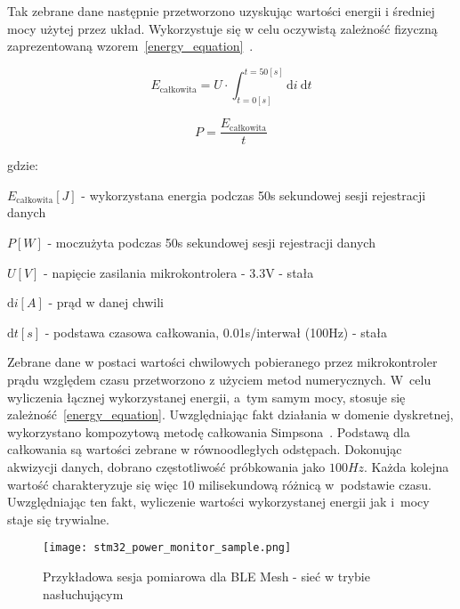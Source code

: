 Tak zebrane dane następnie przetworzono uzyskując wartości energii i średniej mocy
użytej przez układ. Wykorzystuje się w celu oczywistą zależność fizyczną zaprezentowaną
wzorem~\ref{energy_equation}~\cite{skoro_marta_fizyka_1973}.

\begin{equation} \label{energy_equation}
E_{\text{całkowita}} = U \cdot \int_{t=0[s]}^{t=50[s]} \mathrm{d}i \: \mathrm{d} t
\end{equation}

\begin{equation} \label{power_equation}
P = \frac{E_{\text{całkowita}}}{t}
\end{equation}

gdzie:

\begin{description}
\item $E_{\text{całkowita}} [J]$ - wykorzystana energia podczas 50s sekundowej sesji rejestracji danych
\item $P [W]$ - moczużyta podczas 50s sekundowej sesji rejestracji danych
\item $U [V]$ - napięcie zasilania mikrokontrolera - 3.3V - stała
\item $\mathrm{d}i [A]$ - prąd w danej chwili
\item $\mathrm{d}t [s]$ - podstawa czasowa całkowania, 0.01s/interwał (100Hz) - stała 
\end{description}

Zebrane dane w postaci wartości chwilowych pobieranego przez mikrokontroler prądu względem czasu
przetworzono z użyciem metod numerycznych. W~celu wyliczenia łącznej wykorzystanej energii, a~tym samym
mocy, stosuje się zależność~\ref{energy_equation}. Uwzględniając fakt działania w domenie dyskretnej,
wykorzystano kompozytową metodę całkowania Simpsona~\cite{noauthor_scipyintegratesimpson_nodate}.
Podstawą dla całkowania są wartości zebrane w równoodległych odstępach. Dokonując akwizycji danych,
dobrano częstotliwość próbkowania jako $100Hz$. Każda kolejna wartość charakteryzuje się więc
10 milisekundową różnicą w~podstawie czasu. Uwzględniając ten fakt, wyliczenie wartości
wykorzystanej energii jak i~mocy staje się trywialne.

\begin{figure}[!ht]
	\centering \texttt{[image: stm32\_power\_monitor\_sample.png]}
	\caption{Przykładowa sesja pomiarowa dla BLE Mesh - sieć w trybie nasłuchującym}
	\label{rys:measurement_session_sample}
\end{figure}



